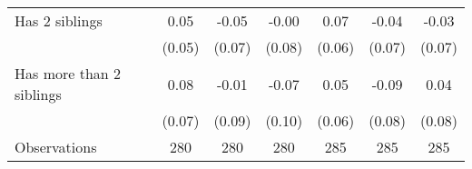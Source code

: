 {\begin{tabular}{l*{6}{c}}
\addlinespace
Has 2 siblings      &        0.05         &       -0.05         &       -0.00         &        0.07         &       -0.04         &       -0.03         \\
                    &      (0.05)         &      (0.07)         &      (0.08)         &      (0.06)         &      (0.07)         &      (0.07)         \\
\addlinespace
Has more than 2 siblings&        0.08         &       -0.01         &       -0.07         &        0.05         &       -0.09         &        0.04         \\
                    &      (0.07)         &      (0.09)         &      (0.10)         &      (0.06)         &      (0.08)         &      (0.08)         \\
\midrule
Observations        &         280         &         280         &         280         &         285         &         285         &         285         \\
\bottomrule
\end{tabular}
}
